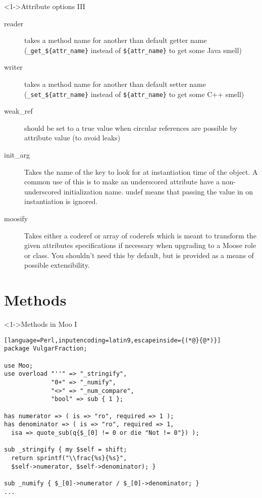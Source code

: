 \documentclass[ngerman,xcolor={table,dvipsnames},scriptsizeer,compress,hyperref={bookmarks,colorlinks}]{beamer}
\begin{document}
\begin{frame}[fragile]

\begin{block}<1->{Attribute options III}
\begin{description}
\item[reader] takes a method name for another than default getter name (\texttt{\_get\_\$\{attr\_name\}} instead of \texttt{\$\{attr\_name\}} to get some Java smell)
\item[writer]  takes a method name for another than default setter name (\texttt{\_set\_\$\{attr\_name\}} instead of \texttt{\$\{attr\_name\}} to get some C++ smell)
\item[weak\_ref] should be set to a true value when circular references are possible by attribute value (to avoid leaks)
\item[init\_arg] Takes the name of the key to look for at instantiation time of the object. A common use of this is to make an underscored attribute have a non-underscored initialization name. undef means that passing the value in on instantiation is ignored.
\item[moosify] Takes either a coderef or array of coderefs which is meant to transform the given attributes specifications if necessary when upgrading to a Moose role or class. You shouldn't need this by default, but is provided as a means of possible extensibility.
\end{description}
\end{block}

\end{frame}

\section{Methods}

\begin{frame}[fragile]

\begin{block}<1->{Methods in Moo I}
\scriptsize
\begin{lstlisting}[language=Perl,inputencoding=latin9,escapeinside={(*@}{@*)}]
package VulgarFraction;

use Moo;
use overload "''" => "_stringify",
             "0+" => "_numify",
             "<>" => "_num_compare",
             "bool" => sub { 1 };

has numerator => ( is => "ro", required => 1 );
has denominator => ( is => "ro", required => 1,
  isa => quote_sub(q{$_[0] != 0 or die "Not != 0"}) );

sub _stringify { my $self = shift;
  return sprintf("\\frac{%s}{%s}",
  $self->numerator, $self->denominator); }

sub _numify { $_[0]->numerator / $_[0]->denominator; }
...
\end{lstlisting}
\end{block}

\end{frame}
\end{document}

